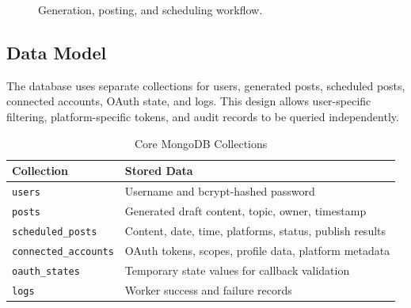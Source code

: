 \documentclass[conference]{IEEEtran}
\begin{document}
\begin{figure}[!t]
\centering
{}
\caption{Generation, posting, and scheduling workflow.}
\label{fig:workflow}
\end{figure}

\subsection{Data Model}
The database uses separate collections for users, generated posts, scheduled posts, connected accounts, OAuth state, and logs. This design allows user-specific filtering, platform-specific tokens, and audit records to be queried independently.

\begin{table}[!t]
\centering
\caption{Core MongoDB Collections}
\label{tab:collections}
\begin{tabular}{p{2.6cm}p{5.1cm}}
\toprule
\textbf{Collection} & \textbf{Stored Data}\\
\midrule
\texttt{users} & Username and bcrypt-hashed password\\
\texttt{posts} & Generated draft content, topic, owner, timestamp\\
\texttt{scheduled\_posts} & Content, date, time, platforms, status, publish results\\
\texttt{connected\_accounts} & OAuth tokens, scopes, profile data, platform metadata\\
\texttt{oauth\_states} & Temporary state values for callback validation\\
\texttt{logs} & Worker success and failure records\\
\bottomrule
\end{tabular}
\end{table}
\end{document}
